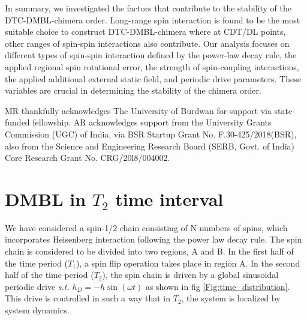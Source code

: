 \documentclass[%
reprint,
superscriptaddress,
amsmath,amssymb,showkeys,
aps,
prb,
]{revtex4-2}
\begin{document}
	In summary, we investigated the factors that contribute to the stability of the DTC-DMBL-chimera order. Long-range spin interaction is found to be the most suitable choice to construct DTC-DMBL-chimera where at CDT/DL points, other ranges of spin-spin interactions also contribute. Our analysis focuses on different types of spin-spin interaction defined by the power-law decay rule, the applied regional spin rotational error, the strength of spin-coupling interactions, the applied additional external static field, and periodic drive parameters. These variables are crucial in determining the stability of the chimera order.\\
	
	
	\begin{acknowledgments}
		MR thankfully acknowledges The University of Burdwan for support via state-funded fellowship. AR acknowledges support from the University Grants Commission (UGC) of India, via BSR Startup Grant No. F.30-425/2018(BSR), also from the Science and Engineering Research Board (SERB, Govt. of India) Core Research Grant No. CRG/20l8/004002.
	\end{acknowledgments}
	
	
	\newpage
	\clearpage
	\appendix
	\onecolumngrid
	\section{\label{sec:AppendixA} DMBL in $T_2$ time interval}
	
	We have considered a spin-1/2 chain consisting of N numbers of spins, which  incorporates Heisenberg interaction following the power law decay rule. The spin chain is considered to be divided into two regions, A and B. In the first half of the time period ($T_1$), a spin flip operation takes place in region A. In the second half of the time period ($T_2$), the spin chain is driven by a global sinusoidal periodic drive \textit{s.t.} $h_D = -h\sin(\omega t)$ as shown in fig \ref{Fig:time_distribution}. This drive is controlled in such a way that in $T_2$, the system is localized by system dynamics.
	
\end{document}

